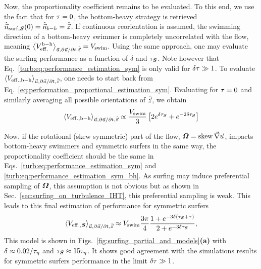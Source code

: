 Now, the proportionality coefficient remains to be evaluated.
To this end, we use the fact that for $\tau = 0$, the bottom-heavy strategy is retrieved $\hat{\vec{n}}_{\mathrm{surf}, \boldsymbol{S}}(0) = \hat{\vec{n}}_{b-h} = \hat{\vec{z}}$.
If continuous reorientation is assumed, the swimming direction of a bottom-heavy swimmer is completely uncorrelated with the flow, meaning $\left\langle V_{\mathrm{eff.}}^{\mathrm{b-h}} \right\rangle_{\vec{u}, \partial \vec{u} / \partial t, \hat{\vec{z}}} = V_{\mathrm{swim}}$.
Using the same approach, one may evaluate the surfing performance as a function of $\delta$ and $\tau_{\boldsymbol{S}}$.
Note however that Eq.~\eqref{turb:eq:performance_estimation_sym} is only valid for $\delta \tau \gg 1$.
To evaluate $\left\langle V_{\mathrm{eff.}, \mathrm{b-h}} \right\rangle_{\vec{u}, \partial \vec{u} / \partial t, \hat{\vec{z}}}$, one needs to start back from Eq.~\eqref{eq:performation_proportional_estimation_sym}.
Evaluating for $\tau = 0$ and similarly averaging all possible orientations of $\hat{\vec{z}}$, we obtain
\begin{equation}\label{turb:eq:performance_estimation_sym_bh}
	 \left\langle V_{\mathrm{eff.}, \mathrm{b-h}} \right\rangle_{\vec{u}, \partial \vec{u} / \partial t, \hat{\vec{z}}} \propto \frac{V_{\mathrm{swim}}}{3} \left[ 2 e^{\delta \tau_{\boldsymbol{S}}} + e^{-2 \delta \tau_{\boldsymbol{S}}} \right]
\end{equation}

Now, if the rotational (skew symmetric) part of the flow, $\boldsymbol{\varOmega} = \operatorname{skew} \vec{\nabla} \vec{u}$, impacts bottom-heavy swimmers and symmetric surfers in the same way, the proportionality coefficient should be the same in Eqs.~\eqref{turb:eq:performance_estimation_sym} and \eqref{turb:eq:performance_estimation_sym_bh}.
As surfing may induce preferential sampling of $\boldsymbol{\varOmega}$, this assumption is not obvious but as shown in Sec.~\ref{sec:surfing_on_turbulence_IHT}, this preferential sampling is weak.
This leads to this final estimation of performance for symmetric surfers
\begin{equation}\label{turb:eq:performance_estimation_sym_final}
	 \left\langle V_{\mathrm{eff.}, \boldsymbol{S}} \right\rangle_{\vec{u}, \partial \vec{u} / \partial t, \hat{\vec{z}}} \approx V_{\mathrm{swim}} \frac{3\pi}{4} \frac{1 + e^{-3 \delta ( \tau_{\boldsymbol{S}} + \tau )}}{ 2 + e^{-3 \delta \tau_{\boldsymbol{S}}}},
\end{equation}
This model is shown in Figs.~\ref{fig:surfing_partial_and_models}\textbf{(a)} with $\delta \approx 0.02/\tau_{\eta}$ and $\tau_{\boldsymbol{S}} \approx 15 \tau_{\eta}$. 
It shows good agreement with the simulations results for symmetric surfers performance in the limit $\delta \tau \gg 1$.

